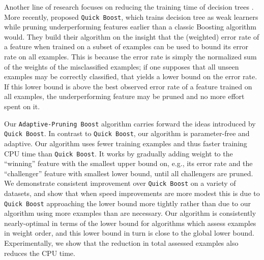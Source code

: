 Another line of research focuses on reducing the training time of decision trees
\citep{implementing-decision-trees-and-forests-on-a-gpu, articleWuEtAl}.
More recently, \citet{icml2013_appel13} proposed \texttt{Quick Boost}, which
trains decision tree as weak learners while pruning underperforming
features earlier than a classic Boosting algorithm would.
They build their algorithm on the insight that the (weighted) error rate of
a feature when trained on a subset of examples can be used to bound its error
rate on all examples.
This is because the error rate is simply the normalized sum of the weights of the misclassified examples; if one supposes that all unseen examples may be
correctly classified, that yields a lower bound on the error rate.
If this lower bound is above the best observed error rate of a feature
trained on all examples, the underperforming feature may be pruned and no
more effort spent on it.

Our \texttt{Adaptive-Pruning Boost} algorithm carries forward the ideas
introduced by \texttt{Quick Boost}.
In contrast to \texttt{Quick Boost},
our algorithm is parameter-free and adaptive.
Our algorithm uses fewer training examples and thus faster training CPU time than
\texttt{Quick Boost}.
It works by gradually adding weight to the
``winning'' feature with the smallest upper bound on, e.g., its error rate
and the ``challenger'' feature with smallest lower bound,
until all challengers are pruned.
We demonstrate consistent improvement over \texttt{Quick Boost} on a
variety of datasets,
and show that when speed improvements are more modest this is due to
\texttt{Quick Boost} approaching the lower bound more tightly rather than
due to our algorithm using more examples than are necessary.
Our algorithm is consistently nearly-optimal in terms of the lower bound
for algorithms which assess examples in weight order,
and this lower bound in turn is close to the global lower bound.
Experimentally, we show that the reduction in total assessed examples
also reduces the CPU time.

